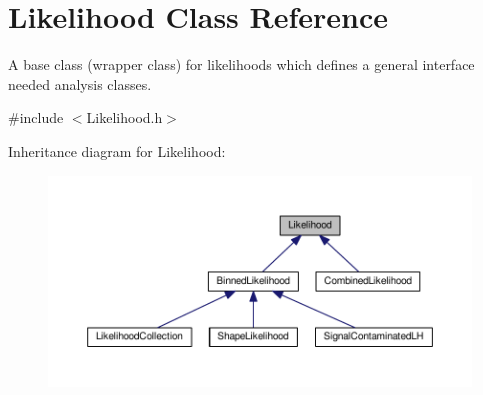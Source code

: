 \hypertarget{classLikelihood}{\section{Likelihood Class Reference}
\label{classLikelihood}
}


A base class (wrapper class) for likelihoods which defines a general interface needed analysis classes.  




{\ttfamily \#include $<$Likelihood.\-h$>$}



Inheritance diagram for Likelihood\-:
\nopagebreak
\begin{figure}[H]
\begin{center}
\leavevmode
\includegraphics[width=350pt]{classLikelihood__inherit__graph}
\end{center}
\end{figure}
